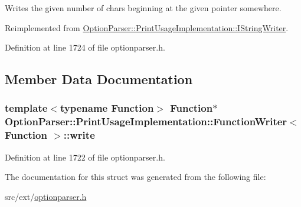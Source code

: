 Writes the given number of chars beginning at the given pointer somewhere. 



Reimplemented from \hyperlink{struct_option_parser_1_1_print_usage_implementation_1_1_i_string_writer_acae5e8911028920188394436f9712251}{Option\-Parser\-::\-Print\-Usage\-Implementation\-::\-I\-String\-Writer}.



Definition at line 1724 of file optionparser.\-h.



\subsection{Member Data Documentation}
\hypertarget{struct_option_parser_1_1_print_usage_implementation_1_1_function_writer_a818f643ba521b0ca66dc13a9a32e5750}{
\subsubsection[{write}]{\setlength{\rightskip}{0pt plus 5cm}template$<$typename Function$>$ Function$\ast$ {\bf Option\-Parser\-::\-Print\-Usage\-Implementation\-::\-Function\-Writer}$<$ Function $>$\-::write}}\label{struct_option_parser_1_1_print_usage_implementation_1_1_function_writer_a818f643ba521b0ca66dc13a9a32e5750}


Definition at line 1722 of file optionparser.\-h.



The documentation for this struct was generated from the following file\-:\begin{DoxyCompactItemize}
\item 
src/ext/\hyperlink{optionparser_8h}{optionparser.\-h}\end{DoxyCompactItemize}
